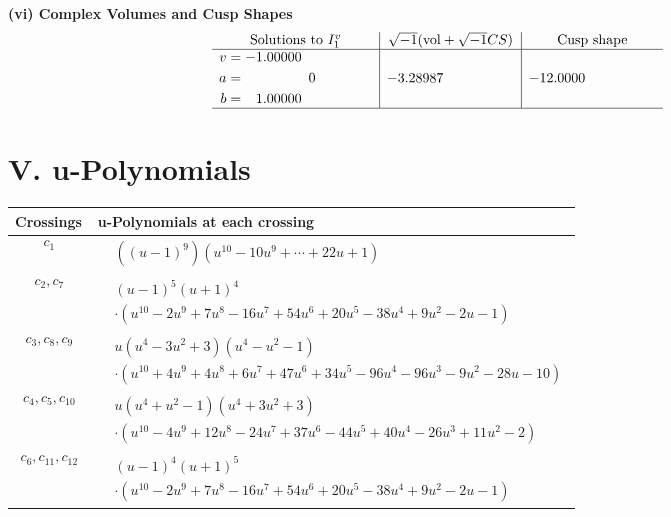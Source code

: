 \documentclass[1p]{elsarticle_modified}
\theoremstyle{definition}
\newcommand{\I}{\sqrt{-1}}
\begin{document}
\newpage\flushleft \textbf{(vi) Complex Volumes and Cusp Shapes}
$$\begin{array}{c|c|c}  
\text{Solutions to }I^v_{1}& \I (\text{vol} + \sqrt{-1}CS) & \text{Cusp shape}\\
 \hline 
\begin{aligned}
v &= -1.00000\phantom{ +0.000000I} \\
a &= \phantom{-0.000000 } 0 \\
b &= \phantom{-}1.00000\phantom{ +0.000000I}\end{aligned}
 & -3.28987\phantom{ +0.000000I} & -12.0000\phantom{ +0.000000I}\\
 \hline 
 \end{array}$$\newpage
\newpage\renewcommand{\arraystretch}{1}
\centering \section*{ V. u-Polynomials}
\begin{tabular}{m{50pt}|m{274pt}}
Crossings & \hspace{64pt}u-Polynomials at each crossing \\
\hline $$\begin{aligned}c_{1}\end{aligned}$$&$\begin{aligned}
&((u-1)^9)(u^{10}-10 u^9+\cdots+22 u+1)
\end{aligned}$\\
\hline $$\begin{aligned}c_{2},c_{7}\end{aligned}$$&$\begin{aligned}
&(u-1)^5(u+1)^4\\
&\cdot(u^{10}-2 u^9+7 u^8-16 u^7+54 u^6+20 u^5-38 u^4+9 u^2-2 u-1)
\end{aligned}$\\
\hline $$\begin{aligned}c_{3},c_{8},c_{9}\end{aligned}$$&$\begin{aligned}
&u(u^4-3 u^2+3)(u^4- u^2-1)\\
&\cdot(u^{10}+4 u^9+4 u^8+6 u^7+47 u^6+34 u^5-96 u^4-96 u^3-9 u^2-28 u-10)
\end{aligned}$\\
\hline $$\begin{aligned}c_{4},c_{5},c_{10}\end{aligned}$$&$\begin{aligned}
&u(u^4+u^2-1)(u^4+3 u^2+3)\\
&\cdot(u^{10}-4 u^9+12 u^8-24 u^7+37 u^6-44 u^5+40 u^4-26 u^3+11 u^2-2)
\end{aligned}$\\
\hline $$\begin{aligned}c_{6},c_{11},c_{12}\end{aligned}$$&$\begin{aligned}
&(u-1)^4(u+1)^5\\
&\cdot(u^{10}-2 u^9+7 u^8-16 u^7+54 u^6+20 u^5-38 u^4+9 u^2-2 u-1)
\end{aligned}$\\
\hline
\end{tabular}\newpage\renewcommand{\arraystretch}{1}
\end{document}
